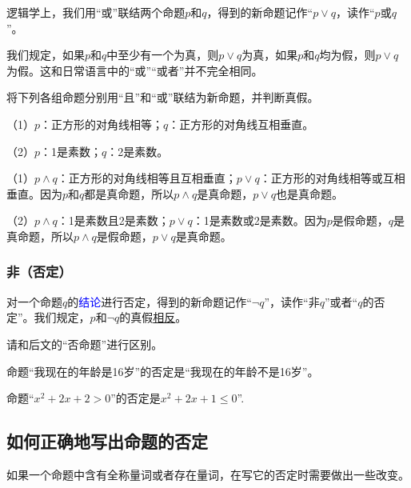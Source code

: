 \documentclass[lang=cn,math=cm,chinesefont=nofont,11pt,scheme=chinese,twocol]{elegantbook}
\begin{document}
逻辑学上，我们用“或”联结两个命题$p$和$q$，得到的新命题记作“$p\lor q$，读作“$p$或$q$”。

我们规定，如果$p$和$q$中至少有一个为真，则$p\lor q$为真，如果$p$和$q$均为假，则$p\lor q$为假。这和日常语言中的“或”“或者”并不完全相同。

\hspace*{\fill}

\begin{example}
  将下列各组命题分别用“且”和“或”联结为新命题，并判断真假。
\end{example}

（1）$p$：正方形的对角线相等；$q$：正方形的对角线互相垂直。

（2）$p$：1是素数；$q$：2是素数。

\begin{solution}
  （1）$p\land q$：正方形的对角线相等且互相垂直；$p\lor q$：正方形的对角线相等或互相垂直。因为$p$和$q$都是真命题，所以$p\land q$是真命题，$p\lor q$也是真命题。

  （2）$p\land q$：1是素数且2是素数；$p\lor q$：1是素数或2是素数。因为$p$是假命题，$q$是真命题，所以$p\land q$是假命题，$p\lor q$是真命题。
\end{solution}

\subsubsection{非（否定）}

对一个命题$q$的\textcolor{blue}{结论}进行否定，得到的新命题记作“$\neg q$”，读作“非$q$”或者“$q$的否定”。我们规定，$p$和$\neg q$的真假\underline{相反}。

\begin{remark}
  请和后文的“否命题”进行区别。
\end{remark}

\begin{example}
  命题“我现在的年龄是16岁”的否定是“我现在的年龄不是16岁”。
\end{example}

\begin{example}
  命题“$x^2+2x+2>0$”的否定是$x^2+2x+1\leq 0$”.
\end{example}

\subsection{如何正确地写出命题的否定}

如果一个命题中含有全称量词或者存在量词，在写它的否定时需要做出一些改变。
\end{document}
